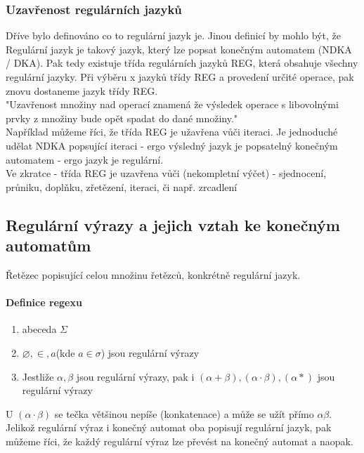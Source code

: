 \documentclass[10pt,a4paper]{article}
\begin{document}
\subsubsection{Uzavřenost regulárních jazyků}
Dříve bylo definováno co to regulární jazyk je. Jinou definicí by mohlo být, že Regulární jazyk je takový jazyk, který lze popsat konečným automatem (NDKA / DKA). Pak tedy existuje třída regulárních jazyků REG, která obsahuje všechny regulární jazyky. Při výběru x jazyků třídy REG a provedení určité operace, pak znovu dostaneme jazyk třídy REG.\\
"Uzavřenost množiny nad operací znamená že výsledek operace s libovolnými prvky z množiny bude opět spadat do dané množiny."\\
Například můžeme říci, že třída REG je užavřena vůči iteraci. Je jednoduché udělat NDKA popsující iteraci - ergo výsledný jazyk je popsatelný konečným automatem - ergo jazyk je regulární.\\
Ve zkratce - třída REG je uzavřena vůči (nekompletní výčet) - sjednocení, průniku, doplňku, zřetězení, iteraci, či např. zrcadlení
\subsection{Regulární výrazy a jejich vztah ke konečným automatům}
Řetězec popisující celou množinu řetězců, konkrétně regulární jazyk.
\paragraph{Definice regexu}
\begin{enumerate}
\item abeceda $\Sigma$
\item $\varnothing, \in, a $(kde $a \in \sigma $) jsou regulární výrazy
\item Jestliže $\alpha, \beta$ jsou regulární výrazy, pak i $(\alpha + \beta), (\alpha \cdot \beta), (\alpha*)$ jsou regulární výrazy
\end{enumerate}
U $(\alpha \cdot \beta)$ se tečka většinou nepíše (konkatenace) a může se užít přímo $\alpha \beta$.\\

Jelikož regulární výraz i konečný automat oba popisují regulární jazyk, pak můžeme říci, že každý regulární výraz lze převést na konečný automat a naopak.
\end{document}
